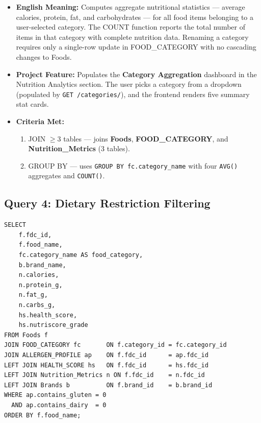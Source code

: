 \documentclass[12pt,a4paper]{article}
\begin{document}
\begin{metabox}
\begin{itemize}
  \item \textbf{English Meaning:} Computes aggregate nutritional statistics --- average calories,
    protein, fat, and carbohydrates --- for all food items belonging to a user-selected category.
    The COUNT function reports the total number of items in that category with complete nutrition
    data. Renaming a category requires only a single-row update in FOOD\_CATEGORY
    with no cascading changes to Foods.
  \item \textbf{Project Feature:} Populates the \textbf{Category Aggregation} dashboard in the
    Nutrition Analytics section. The user picks a category from a dropdown (populated by
    \texttt{GET /categories/}), and the frontend renders five summary stat cards.
  \item \textbf{Criteria Met:}
    \begin{enumerate}[label=\textbf{\arabic*}]
      \item JOIN $\geq$3 tables --- joins \textbf{Foods}, \textbf{FOOD\_CATEGORY}, and
        \textbf{Nutrition\_Metrics} (3 tables).
      \setcounter{enumi}{2}
      \item GROUP BY --- uses \texttt{GROUP BY fc.category\_name} with four \texttt{AVG()}
        aggregates and \texttt{COUNT()}.
    \end{enumerate}
\end{itemize}
\end{metabox}

\newpage

\subsection{Query 4: Dietary Restriction Filtering}

\begin{sqlbox}
\small
\begin{verbatim}
SELECT
    f.fdc_id,
    f.food_name,
    fc.category_name AS food_category,
    b.brand_name,
    n.calories,
    n.protein_g,
    n.fat_g,
    n.carbs_g,
    hs.health_score,
    hs.nutriscore_grade
FROM Foods f
JOIN FOOD_CATEGORY fc       ON f.category_id = fc.category_id
JOIN ALLERGEN_PROFILE ap    ON f.fdc_id      = ap.fdc_id
LEFT JOIN HEALTH_SCORE hs   ON f.fdc_id      = hs.fdc_id
LEFT JOIN Nutrition_Metrics n ON f.fdc_id    = n.fdc_id
LEFT JOIN Brands b          ON f.brand_id    = b.brand_id
WHERE ap.contains_gluten = 0
  AND ap.contains_dairy  = 0
ORDER BY f.food_name;
\end{verbatim}
\end{sqlbox}
\end{document}
